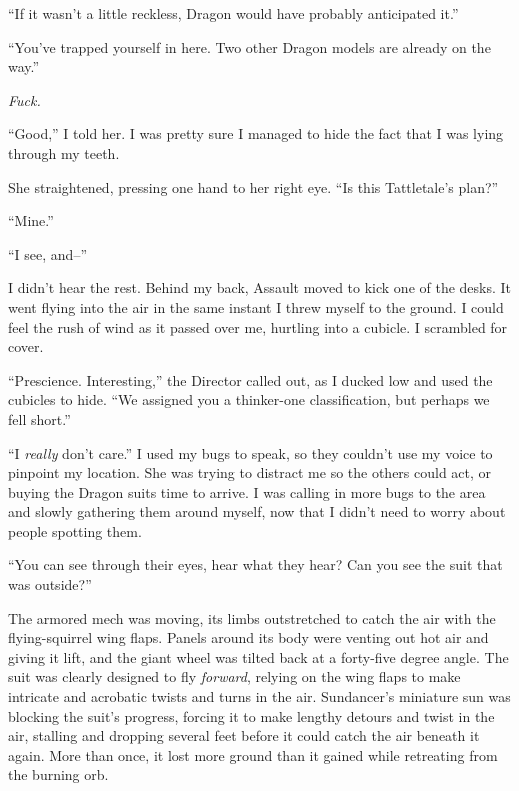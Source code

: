 ``If it wasn't a little reckless, Dragon would have probably anticipated it.''



``You've trapped yourself in here.  Two other Dragon models are already on the way.''



\emph{Fuck.}



``Good,'' I told her.  I was pretty sure I managed to hide the fact that I was lying through my teeth.



She straightened, pressing one hand to her right eye.  ``Is this Tattletale's plan?''



``Mine.''



``I see, and--''



I didn't hear the rest.  Behind my back, Assault moved to kick one of the desks.  It went flying into the air in the same instant I threw myself to the ground.  I could feel the rush of wind as it passed over me, hurtling into a cubicle.  I scrambled for cover.



``Prescience.  Interesting,'' the Director called out, as I ducked low and used the cubicles to hide.  ``We assigned you a thinker-one classification, but perhaps we fell short.''



``I \emph{really} don't care.''  I used my bugs to speak, so they couldn't use my voice to pinpoint my location.  She was trying to distract me so the others could act, or buying the Dragon suits time to arrive.  I was calling in more bugs to the area and slowly gathering them around myself, now that I didn't need to worry about people spotting them.



``You can see through their eyes, hear what they hear?  Can you see the suit that was outside?''



The armored mech was moving, its limbs outstretched to catch the air with the flying-squirrel wing flaps.  Panels around its body were venting out hot air and giving it lift, and the giant wheel was tilted back at a forty-five degree angle.  The suit was clearly designed to fly \emph{forward}, relying on the wing flaps to make intricate and acrobatic twists and turns in the air.  Sundancer's miniature sun was blocking the suit's progress, forcing it to make lengthy detours and twist in the air, stalling and dropping several feet before it could catch the air beneath it again.  More than once, it lost more ground than it gained while retreating from the burning orb.



